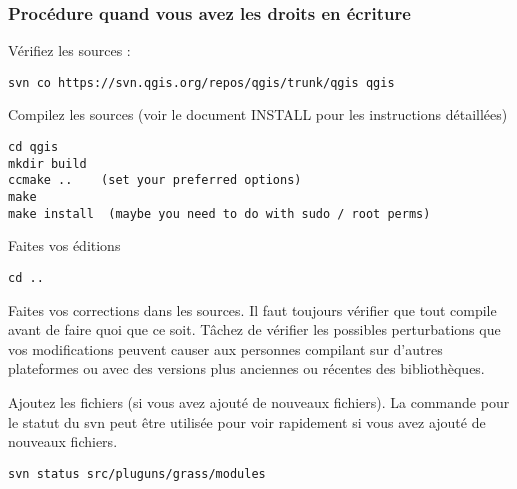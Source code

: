 \subsubsection{Proc\'edure quand vous avez les droits en \'ecriture}
V\'erifiez les sources :

\begin{verbatim}
svn co https://svn.qgis.org/repos/qgis/trunk/qgis qgis
\end{verbatim}

Compilez les sources (voir le document INSTALL pour les instructions d\'etaill\'ees)

\begin{verbatim}
cd qgis
mkdir build
ccmake ..    (set your preferred options)
make
make install  (maybe you need to do with sudo / root perms)
\end{verbatim}

Faites vos \'editions

\begin{verbatim}
cd ..
\end{verbatim}

Faites vos corrections dans les sources. Il faut toujours v\'erifier que tout compile avant de faire quoi que ce soit. T\^achez de v\'erifier les possibles perturbations que vos modifications peuvent causer aux personnes compilant sur d'autres plateformes ou avec des versions plus anciennes ou r\'ecentes des biblioth\`eques.

Ajoutez les fichiers (si vous avez ajout\'e de nouveaux fichiers). La commande pour le statut du svn peut \^etre utilis\'ee pour voir rapidement si vous avez ajout\'e de nouveaux fichiers.

\begin{verbatim}
svn status src/pluguns/grass/modules
\end{verbatim}


